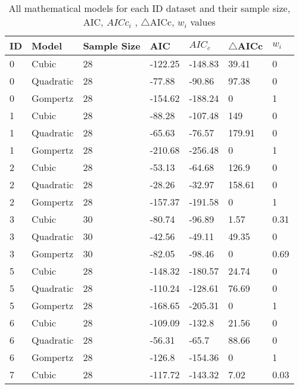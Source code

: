 \documentclass[11pt]{article}
\begin{document}
    \begin{center}
    \begin{longtable}{lllllll}
        \caption{All mathematical models for each ID dataset and their sample size, AIC, $AICc_{i}$ , $\triangle$AICc, $w_{i}$ values }
        \label{table:5}\\
    ID  & Model& Sample Size & AIC & $AIC_{c}$ & $\triangle$AICc & $w_{i}$ \\
    \midrule
    0   & Cubic     & 28              & -122.25 & -148.83 & 39.41   & 0    \\
    0   & Quadratic & 28              & -77.88  & -90.86  & 97.38   & 0    \\
    0   & Gompertz  & 28              & -154.62 & -188.24 & 0       & 1    \\
    1   & Cubic     & 28              & -88.28  & -107.48 & 149     & 0    \\
    1   & Quadratic & 28              & -65.63  & -76.57  & 179.91  & 0    \\
    1   & Gompertz  & 28              & -210.68 & -256.48 & 0       & 1    \\
    2   & Cubic     & 28              & -53.13  & -64.68  & 126.9   & 0    \\
    2   & Quadratic & 28              & -28.26  & -32.97  & 158.61  & 0    \\
    2   & Gompertz  & 28              & -157.37 & -191.58 & 0       & 1    \\
    3   & Cubic     & 30              & -80.74  & -96.89  & 1.57    & 0.31 \\
    3   & Quadratic & 30              & -42.56  & -49.11  & 49.35   & 0    \\
    3   & Gompertz  & 30              & -82.05  & -98.46  & 0       & 0.69 \\
    5   & Cubic     & 28              & -148.32 & -180.57 & 24.74   & 0    \\
    5   & Quadratic & 28              & -110.24 & -128.61 & 76.69   & 0    \\
    5   & Gompertz  & 28              & -168.65 & -205.31 & 0       & 1    \\
    6   & Cubic     & 28              & -109.09 & -132.8  & 21.56   & 0    \\
    6   & Quadratic & 28              & -56.31  & -65.7   & 88.66   & 0    \\
    6   & Gompertz  & 28              & -126.8  & -154.36 & 0       & 1    \\
    7   & Cubic     & 28              & -117.72 & -143.32 & 7.02    & 0.03 \\

\end{longtable}
\end{center}
\end{document}
